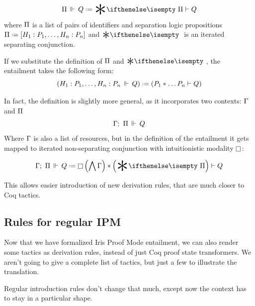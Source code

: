 \[\entailsOneD Q \defeq \Sep \Pi \vdash Q\]
where \(\Pi\) is a list of pairs of identifiers and separation logic propositions \(\SpatD \defeq \left[H_1 : P_1, \ldots , H_n : P_n \right]\) and \(\Sep\) is an iterated separating conjunction.

If we substitute the definition of \(\Pi\) and \(\Sep\), the entailment takes the following form:
\[\left( \entailsOne {H_1 : P_1, \ldots , H_n : P_n} Q \right) \defeq
  \left( P_1 * \ldots P_n \vdash Q \right)\]

In fact, the definition is slightly more general, as it incorporates two contexts: \(\Gamma\) and \(\Pi\)
\[\Gamma ;\,\, \Pi \,\Vdash\, Q\]
Where \(\Gamma\) is also a list of resources, but in the definition of the entailment it gets mapped to iterated non-separating conjunction with intuitionistic modality \(\mathop{\Box}\):

\[\entailsD Q \defeq \intuit \left(\bigwedge \IntuD\right) * \left(\Sep \SpatD\right) \vdash Q\]

This allows easier introduction of new derivation rules, that are much closer to Coq tactics.

\subsection{Rules for regular IPM}
\label{sec:rules-regular-ipm}

Now that we have formalized Iris Proof Mode entailment, we can also render some tactics as derivation rules, instead of just Coq proof state transformers.
We aren't going to give a complete list of tactics, but just a few to illustrate the translation.

Regular introduction rules don't change that much, except now the context has to stay in a particular shape.

